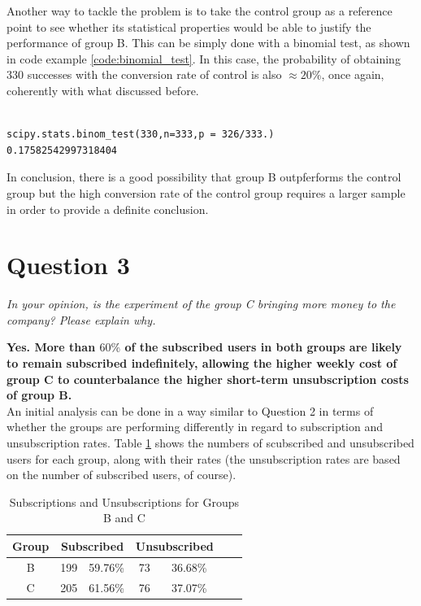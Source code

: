 \documentclass[paper=a4, fontsize=11pt]{report}
\begin{document}
Another way to tackle the problem is to take the control group as a reference point to see whether its statistical properties would be
able to justify the performance of group B. This can be simply done with a binomial test, as shown in code example \ref{code:binomial_test}. In this case, the probability
of obtaining 330 successes with the conversion rate of control is also $\approx 20\%$, once again, coherently with what discussed before.

\begin{lstlisting}[frame=single,caption= Binomial Test\label{code:binomial_test}]

scipy.stats.binom_test(330,n=333,p = 326/333.)
0.17582542997318404
\end{lstlisting}

In conclusion, there is a good possibility that group B outpferforms the control group but the high conversion rate
of the control group requires a larger sample in order to provide a definite conclusion. 



\section*{Question 3}

\textit{In your opinion, is the experiment of the group C bringing more money to the company? Please explain why.}

\textbf{Yes. More than $60\%$ of the subscribed users in both groups are likely to remain subscribed indefinitely, allowing
the higher weekly cost of group C to counterbalance the higher short-term unsubscription costs of group B.}\\


An initial analysis can be done in a way similar to Question 2 in terms of whether the groups are performing differently in regard to subscription and unsubscription rates.
Table \ref{tab:sub_unsub_rates} shows the numbers of scubscribed and unsubscribed users for each group, along with their rates (the unsubscription rates are based on the number of subscribed users, of course).

\begin{table}[htbp]
  \centering
  \caption{Subscriptions and Unsubscriptions for Groups B and C}
    \begin{tabular}{ccccccc}
    \toprule
    \textbf{Group } & \multicolumn{2}{c}{\textbf{Subscribed}} & \multicolumn{2}{c}{\textbf{Unsubscribed}} \\
    \midrule
    B & 199  & 59.76\% & 73  & 36.68\%  \\
    C & 205   & 61.56\% & 76   & 37.07\%  \\
    \bottomrule
    \end{tabular}%
  \label{tab:sub_unsub_rates}%
\end{table}%
\end{document}

